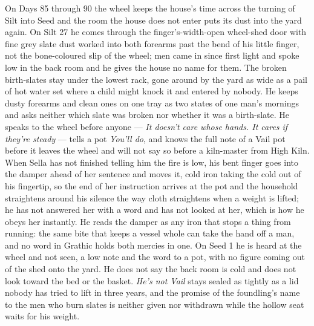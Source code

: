 \documentclass{design/chronicle}
\begin{document}
{On Days 85 through 90 the wheel keeps the house’s time across the turning of Silt into Seed and the room the house does not enter puts its dust into the yard again. On Silt 27 he comes through the finger’s-width-open wheel-shed door with fine grey slate dust worked into both forearms past the bend of his little finger, not the bone-coloured slip of the wheel; men came in since first light and spoke low in the back room and he gives the house no name for them. The broken birth-slates stay under the lowest rack, gone around by the yard as wide as a pail of hot water set where a child might knock it and entered by nobody. He keeps dusty forearms and clean ones on one tray as two states of one man’s mornings and asks neither which slate was broken nor whether it was a birth-slate. He speaks to the wheel before anyone --- \emph{It doesn’t care whose hands. It cares if they’re steady} --- tells a pot \emph{You’ll do}, and knows the full note of a Vail pot before it leaves the wheel and will not say so before a kiln-master from High Kiln. When Sella has not finished telling him the fire is low, his bent finger goes into the damper ahead of her sentence and moves it, cold iron taking the cold out of his fingertip, so the end of her instruction arrives at the pot and the household straightens around his silence the way cloth straightens when a weight is lifted; he has not answered her with a word and has not looked at her, which is how he obeys her instantly. He reads the damper as any iron that stops a thing from running: the same bite that keeps a vessel whole can take the hand off a man, and no word in Grathic holds both mercies in one. On Seed 1 he is heard at the wheel and not seen, a low note and the word to a pot, with no figure coming out of the shed onto the yard. He does not say the back room is cold and does not look toward the bed or the basket. \emph{He’s not Vail} stays sealed as tightly as a lid nobody has tried to lift in three years, and the promise of the foundling’s name to the men who burn slates is neither given nor withdrawn while the hollow seat waits for his weight.

}
\end{document}
